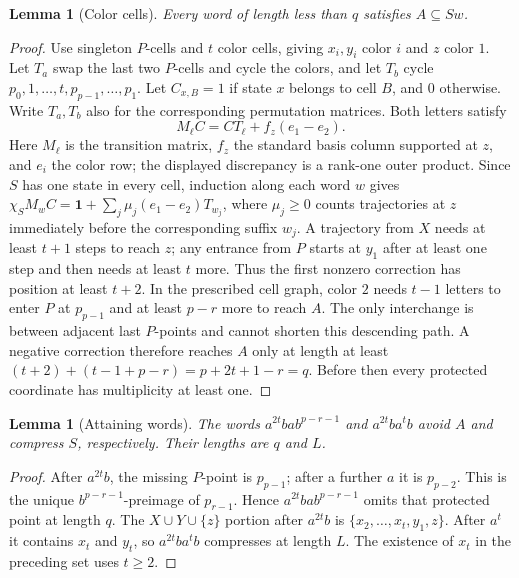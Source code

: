 \documentclass[11pt]{article}
\newtheorem{lemma}[theorem]{Lemma}
\theoremstyle{definition}
\theoremstyle{plain}
\begin{document}
\begin{lemma}[Color cells]\label{lem:binary-colors}
Every word of length less than $q$ satisfies $A\subseteq Sw$.
\end{lemma}
\begin{proof}
Use singleton $P$-cells and $t$ color cells, giving $x_i,y_i$ color $i$
and $z$ color $1$. Let $T_a$ swap the last two $P$-cells and cycle the colors,
and let $T_b$ cycle $p_0,1,\ldots,t,p_{p-1},\ldots,p_1$.
Let $C_{x,B}=1$ if state $x$ belongs to cell $B$, and $0$ otherwise. Write $T_a,T_b$ also for the corresponding permutation matrices. Both letters satisfy
\[
 M_\ell C=CT_\ell+f_z(e_1-e_2).
\]
Here $M_\ell$ is the transition matrix, $f_z$ the standard basis column supported at $z$, and $e_i$ the color row; the displayed discrepancy is a rank-one outer product.
Since $S$ has one state in every cell, induction along each word $w$ gives
$\chi_S M_w C=\mathbf1+\sum_j\mu_j(e_1-e_2)T_{w_j}$,
where $\mu_j\ge0$ counts trajectories at $z$ immediately before the corresponding suffix $w_j$.
A trajectory from $X$ needs at least $t+1$ steps to reach $z$;
any entrance from $P$ starts at $y_1$ after at least one step and then needs
at least $t$ more. Thus the first nonzero correction has position at least $t+2$.
In the prescribed cell graph, color $2$ needs $t-1$ letters to enter $P$
at $p_{p-1}$ and at least $p-r$ more to reach $A$.
The only interchange is between adjacent last $P$-points and cannot shorten
this descending path. A negative correction therefore reaches $A$ only at
length at least $(t+2)+(t-1+p-r)=p+2t+1-r=q$.
Before then every protected coordinate has multiplicity at least one.

\end{proof}
\begin{lemma}[Attaining words]\label{lem:binary-attainment}
The words $a^{2t}bab^{p-r-1}$ and $a^{2t}ba^tb$ avoid $A$ and
compress $S$, respectively. Their lengths are $q$ and $L$.
\end{lemma}
\begin{proof}
After $a^{2t}b$, the missing $P$-point is $p_{p-1}$; after a further $a$
it is $p_{p-2}$. This is the unique $b^{p-r-1}$-preimage of $p_{r-1}$.
Hence $a^{2t}bab^{p-r-1}$ omits that protected point at length $q$.
The $X\cup Y\cup\{z\}$ portion after $a^{2t}b$ is
$\{x_2,\ldots,x_t,y_1,z\}$. After $a^t$ it contains $x_t$ and $y_t$,
so $a^{2t}ba^tb$ compresses at length $L$.
The existence of $x_t$ in the preceding set uses $t\ge2$.


\end{proof}
\end{document}
